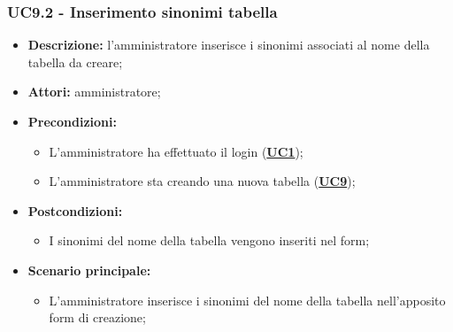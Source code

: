 \subsubsection{UC9.2 - Inserimento sinonimi tabella}
\label{sec:UC9.2}
\begin{itemize}
	\item \textbf{Descrizione:} l’amministratore inserisce i sinonimi associati al nome della tabella da creare;
	\item \textbf{Attori:} amministratore;
	\item \textbf{Precondizioni:} 
	\begin{itemize}
		\item L’amministratore ha effettuato il login (\hyperref[sec:UC1]{\textbf{UC1}});
		\item L’amministratore sta creando una nuova tabella (\hyperref[sec:UC9]{\textbf{UC9}});
	\end{itemize}
	\item \textbf{Postcondizioni:} 
	\begin{itemize}
		\item I sinonimi del nome della tabella vengono inseriti nel form;
	\end{itemize}
	\item \textbf{Scenario principale:} 
	\begin{itemize}
		\item L’amministratore inserisce i sinonimi del nome della tabella nell'apposito form di creazione;
	\end{itemize}
\end{itemize}

